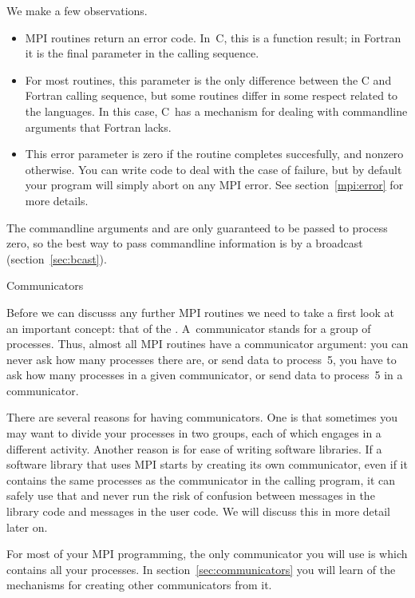 We make a few observations.
\begin{itemize}
\item MPI routines return an error code. In~C, this is a function
  result; in Fortran it is the final parameter in the calling
  sequence.
\item For most routines, this parameter is the only difference between
  the C and Fortran calling sequence, but some routines differ in some
  respect related to the languages. In this case, C~has a mechanism
  for dealing with commandline arguments that Fortran lacks.
\item This error parameter is zero if the routine completes
  succesfully, and nonzero otherwise. You can write code to deal with
  the case of failure, but by default your program will simply abort
  on any MPI error. See section~\ref{mpi:error} for more details.
\end{itemize}

The commandline arguments  and  are only guaranteed to
be passed to process zero, so the best way to pass commandline information
is by a broadcast (section~\ref{sec:bcast}).

 {Communicators}
\label{sec:comm-intro}

Before we can discusss any further MPI routines we need to take a first look at an 
important concept: that of the . A~communicator
stands for a group of processes. Thus, almost all MPI routines have
a communicator argument: you can never ask how many processes there are, or 
send data to process~5, you have to ask how many processes in a given communicator,
or send data to process~5 in a communicator.

There are several reasons for having communicators. One is that sometimes you 
may want to divide your processes in two groups, each of which engages in a 
different activity. Another reason is for ease of writing software libraries.
If a software library that uses MPI starts by creating its own communicator,
even if it contains the same processes as the communicator in the calling program,
it can safely use that and never run the risk of confusion between messages 
in the library code and messages in the user code. We will discuss this in more detail
later on.

For most of your MPI programming, the only communicator you will use
is  which contains all your
processes. In section~\ref{sec:communicators}
you will learn of the mechanisms for creating other
communicators from it.

